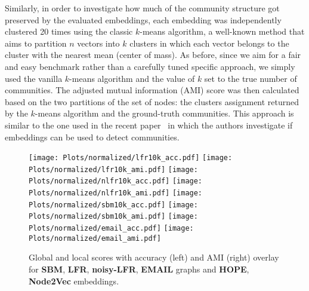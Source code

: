 \documentclass[11pt]{article}
\begin{document}
\medskip

Similarly, in order to investigate how much of the community structure got preserved by the evaluated embeddings, each embedding was independently clustered 20 times using the classic $k$-means algorithm, a well-known method that aims to partition $n$ vectors into $k$ clusters in which each vector belongs to the cluster with the nearest mean (center of mass). As before, since we aim for a fair and easy benchmark rather than a carefully tuned specific approach, we simply used the vanilla $k$-means algorithm and the value of $k$ set to the true number of communities. The adjusted mutual information (AMI) score was then calculated based on the two partitions of the set of nodes: the clusters assignment returned by the $k$-means algorithm and the ground-truth communities. This approach is similar to the one used in the recent paper~\cite{tandon2021community} in which the authors investigate if embeddings can be used to detect communities.

\begin{figure}[h!]
    \centering
    \texttt{[image: Plots/normalized/lfr10k\_acc.pdf]}
        \hspace{.1cm}
    \texttt{[image: Plots/normalized/lfr10k\_ami.pdf]}
    \vspace{.1cm}
    \texttt{[image: Plots/normalized/nlfr10k\_acc.pdf]}
        \hspace{.1cm}
    \texttt{[image: Plots/normalized/nlfr10k\_ami.pdf]}
    \vspace{.1cm}
    \texttt{[image: Plots/normalized/sbm10k\_acc.pdf]}
        \hspace{.1cm}
    \texttt{[image: Plots/normalized/sbm10k\_ami.pdf]}
    \vspace{.1cm}
    \texttt{[image: Plots/normalized/email\_acc.pdf]}
        \hspace{.1cm}
    \texttt{[image: Plots/normalized/email\_ami.pdf]}
    \caption{Global and local scores with accuracy (left) and AMI (right) overlay for \textbf{SBM}, \textbf{LFR}, \textbf{noisy-LFR}, \textbf{EMAIL} graphs and \textbf{HOPE}, \textbf{Node2Vec} embeddings.}
    \label{fig:normalized}
\end{figure}

\medskip
\end{document}
